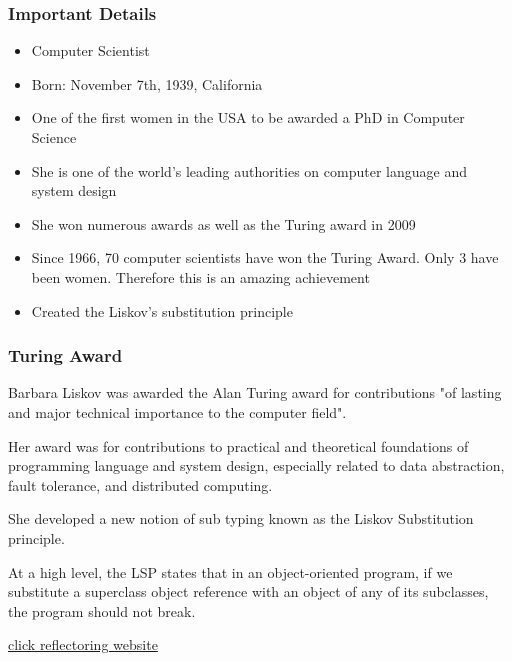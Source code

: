 \documentclass{beamer}
\begin{document}
\begin{frame}
\frametitle{Important Details}
\begin{itemize}
\item Computer Scientist
\item Born: November 7th, 1939, California
\item One of the first women in the USA to be awarded a PhD in Computer Science
\item She is one of the world's leading authorities on computer language and system design
\item She won numerous awards as well as the Turing award in 2009
\item Since 1966, 70 computer scientists have won the Turing Award. Only 3 have been women. Therefore this is an amazing achievement
\item Created the Liskov's substitution principle
\end{itemize}
\end{frame}


\begin{frame}
\frametitle{Turing Award}
Barbara Liskov was awarded the Alan Turing award for  contributions "of lasting and major technical importance to the computer field". 

\vspace{5mm} %

Her award was for contributions to practical and theoretical foundations of programming language and system design, especially related to data abstraction, fault tolerance, and distributed computing. 

\vspace{5mm}

She developed a new notion of sub typing known as the Liskov Substitution principle.

\vspace{5mm} %

At a high level, the LSP states that in an object-oriented program, if we substitute a superclass object reference with an object of any of its subclasses, the program should not break.\\

\vspace{1mm}

\href{https://reflectoring.io/lsp-explained/}{click reflectoring website}
\end{frame}
\end{document}
